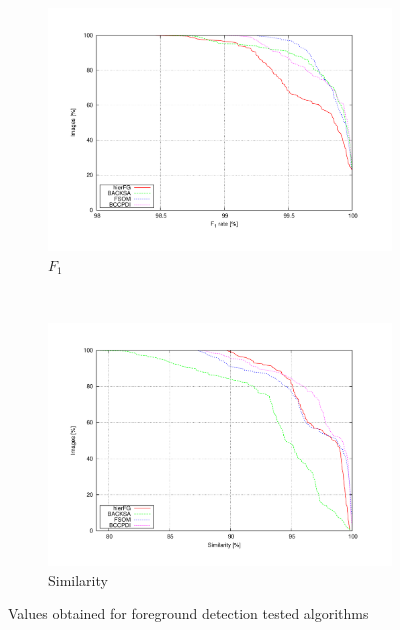 \begin{figure}[t]
        \begin{subfigure}[b]{0.5\textwidth}
                \centering
                \includegraphics[width=\textwidth, trim=50 40 80 50,clip]{fig11.pdf}
                \caption{$F_1$}
                \label{fig:cp02_f1Chart}
        \end{subfigure}%
        ~ %
        \begin{subfigure}[b]{0.5\textwidth}
                \centering
                \includegraphics[width=\textwidth, trim=50 40 80 50,clip]{fig12.pdf}
                \caption{Similarity}
                \label{fig:cp02_similarityChart}
        \end{subfigure}
        \caption{Values obtained for foreground detection tested algorithms}\label{fig:cp02_chartsFG}
\end{figure}

